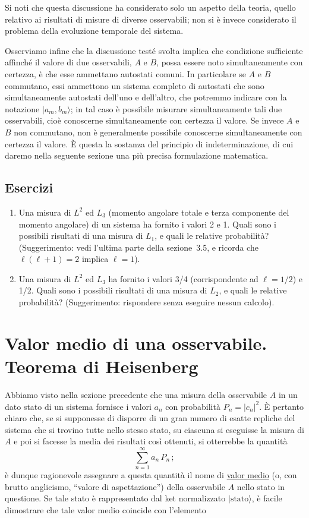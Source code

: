 \documentclass[11pt, a4paper]{book}
\numberwithin{equation}{section}
\newenvironment{esercizi}{\subsection*{Esercizi}\begin{enumerate}}{\end{enumerate}}
\begin{document}
Si noti che questa discussione ha considerato solo un aspetto della teoria, quello relativo ai risultati di misure di diverse osservabili; non si è invece considerato il problema della evoluzione temporale del sistema.

Osserviamo infine che la discussione testé svolta implica che condizione sufficiente affinché il valore di due osservabili, $A$ e $B$, possa essere noto simultaneamente con certezza, è che esse ammettano autostati comuni. In particolare se $A$ e $B$ commutano, essi ammettono un sistema completo di autostati che sono simultaneamente autostati dell'uno e dell'altro, che potremmo indicare con la notazione $|a_m,b_m\rangle$; in tal caso è possibile misurare simultaneamente tali due osservabili, cioè conoscerne simultaneamente con certezza il valore. Se invece $A$ e $B$ non commutano, non è generalmente possibile conoscerne simultaneamente con certezza il valore. È questa la sostanza del principio di indeterminazione, di cui daremo nella seguente sezione una più precisa formulazione matematica.

\begin{esercizi}
\item Una misura di $L^2$ ed $L_3$ (momento angolare totale e terza componente del momento angolare) di un sistema ha fornito i valori 2 e 1. Quali sono i possibili risultati di una misura di $L_1$, e quali le relative probabilità? (Suggerimento: vedi l'ultima parte della sezione~3.5, e ricorda che $\ell(\ell+1)=2$ implica $\ell=1$).

\item Una misura di $L^2$ ed $L_3$ ha fornito i valori 3/4 (corrispondente ad $\ell=1/2$) e 1/2. Quali sono i possibili risultati di una misura di $L_2$, e quali le relative probabilità? (Suggerimento: rispondere senza eseguire nessun calcolo).
\end{esercizi}

\section{Valor medio di una osservabile. Teorema di Heisenberg}

Abbiamo visto nella sezione precedente che una misura della osservabile $A$ in un dato stato di un sistema fornisce i valori $a_n$ con probabilità $P_n=|c_n|^2$. È pertanto chiaro che, se si supponesse di disporre di un gran numero di esatte repliche del sistema che si trovino tutte nello stesso stato, su ciascuna si eseguisse la misura di $A$ e poi si facesse la media dei risultati così ottenuti, si otterrebbe la quantità
\[
\sum_{n=1}^{\infty}a_n\,P_n\,;
\]
è dunque ragionevole assegnare a questa quantità il nome di \uline{valor medio} (o, con brutto anglicismo, ``valore di aspettazione'') della osservabile $A$ nello stato in questione. Se tale stato è rappresentato dal ket normalizzato $|\text{stato}\rangle$, è facile dimostrare che tale valor medio coincide con l'elemento
\end{document}
